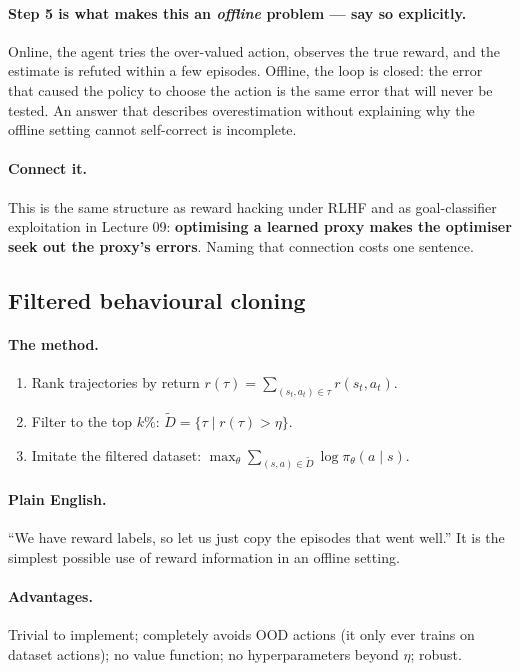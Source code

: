 \documentclass[11pt,a4paper]{article}
\begin{document}
\paragraph{Step 5 is what makes this an \emph{offline} problem --- say so
explicitly.} Online, the agent tries the over-valued action, observes the true
reward, and the estimate is refuted within a few episodes. Offline, the loop
is closed: the error that caused the policy to choose the action is the same
error that will never be tested. An answer that describes overestimation
without explaining why the offline setting cannot self-correct is incomplete.

\paragraph{Connect it.} This is the same structure as reward hacking under
RLHF and as goal-classifier exploitation in Lecture 09:
\textbf{optimising a learned proxy makes the optimiser seek out the proxy's
errors}. Naming that connection costs one sentence.

\subsection{Filtered behavioural cloning}

\paragraph{The method.}
\begin{enumerate}[label=\arabic*.]
\item Rank trajectories by return $r(\tau)=\sum_{(s_t,a_t)\in\tau} r(s_t,a_t)$.
\item Filter to the top $k\%$: $\tilde D=\{\tau\mid r(\tau)>\eta\}$.
\item Imitate the filtered dataset: $\max_\theta\sum_{(s,a)\in\tilde D}\log\pi_\theta(a\mid s)$.
\end{enumerate}

\paragraph{Plain English.} ``We have reward labels, so let us just copy the
episodes that went well.'' It is the simplest possible use of reward
information in an offline setting.

\paragraph{Advantages.} Trivial to implement; completely avoids OOD actions
(it only ever trains on dataset actions); no value function; no
hyperparameters beyond $\eta$; robust.
\end{document}
